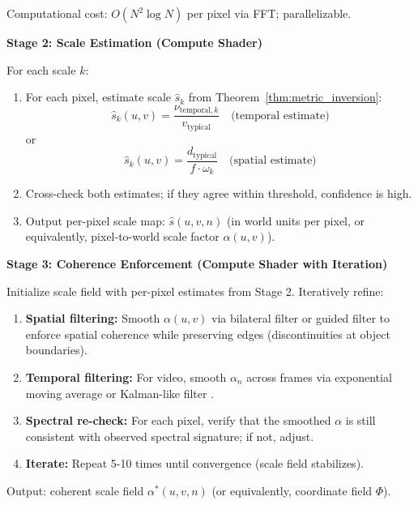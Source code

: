 \documentclass[11pt,twocolumn,a4paper]{article}
\theoremstyle{definition}
\begin{document}
Computational cost: $O(N^2 \log N)$ per pixel via FFT; parallelizable.

\textbf{Stage 2: Scale Estimation (Compute Shader)}

For each scale $k$:

\begin{enumerate}[leftmargin=1.4em]
  \item For each pixel, estimate scale $\hat{s}_k$ from Theorem~\ref{thm:metric_inversion}:
    \begin{equation}
    \hat{s}_k(u,v) = \frac{\nu_{\text{temporal},k}}{v_{\text{typical}}} \quad \text{(temporal estimate)}
    \end{equation}
    or
    \begin{equation}
    \hat{s}_k(u,v) = \frac{d_{\text{typical}}}{f \cdot \omega_k} \quad \text{(spatial estimate)}
    \end{equation}
  \item Cross-check both estimates; if they agree within threshold, confidence is high.
  \item Output per-pixel scale map: $\hat{s}(u,v,n)$ (in world units per pixel, or equivalently, pixel-to-world scale factor $\alpha(u,v)$).
\end{enumerate}

\textbf{Stage 3: Coherence Enforcement (Compute Shader with Iteration)}

Initialize scale field with per-pixel estimates from Stage 2. Iteratively refine:

\begin{enumerate}[leftmargin=1.4em]
  \item \textbf{Spatial filtering:} Smooth $\alpha(u,v)$ via bilateral filter \citep{tomasi1998} or guided filter to enforce spatial coherence while preserving edges (discontinuities at object boundaries).
  \item \textbf{Temporal filtering:} For video, smooth $\alpha_n$ across frames via exponential moving average or Kalman-like filter \citep{barron1994}.
  \item \textbf{Spectral re-check:} For each pixel, verify that the smoothed $\alpha$ is still consistent with observed spectral signature; if not, adjust.
  \item \textbf{Iterate:} Repeat 5-10 times until convergence (scale field stabilizes).
\end{enumerate}

Output: coherent scale field $\alpha^*(u,v,n)$ (or equivalently, coordinate field $\Phi$).
\end{document}
